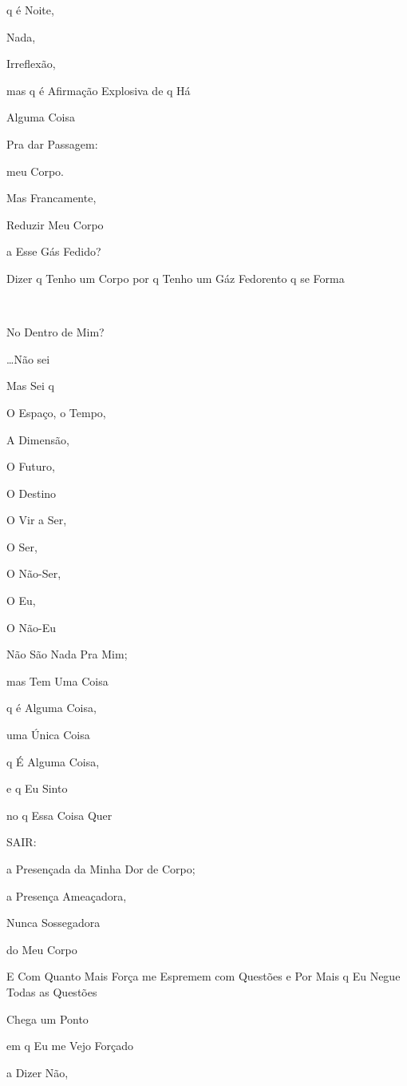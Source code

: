 q é Noite,

Nada,

Irreflexão,

mas q é Afirmação Explosiva de q Há

Alguma Coisa

Pra dar Passagem:

meu Corpo.


Mas Francamente, 

Reduzir Meu Corpo

a Esse Gás Fedido?

Dizer q Tenho um Corpo por q Tenho um Gáz Fedorento q se Forma

~

No Dentro de Mim?


\ldots{}Não sei

Mas Sei q

O Espaço, o Tempo, 

A Dimensão,

O Futuro,

O Destino

O Vir a Ser,

O Ser, 

O Não-Ser, 

O Eu, 

O Não-Eu

Não São Nada Pra Mim;

mas Tem Uma Coisa

q é Alguma Coisa,

uma Única Coisa

q É Alguma Coisa,

e q Eu Sinto

no q Essa Coisa Quer

SAIR:

a Presençada da Minha Dor de Corpo;

a Presença Ameaçadora,

Nunca Sossegadora

do Meu Corpo


E Com Quanto Mais Força me Espremem com Questões
e Por Mais q Eu Negue Todas as Questões

Chega um Ponto

em q Eu me Vejo Forçado \EP[3]

a Dizer Não,

